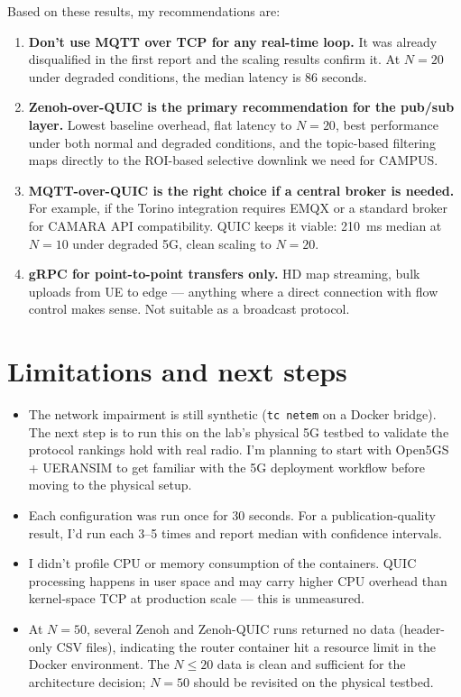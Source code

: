 \documentclass[11pt,a4paper]{article}
\begin{document}
Based on these results, my recommendations are:

\begin{enumerate}
    \item \textbf{Don't use MQTT over TCP for any real-time loop.} It was already disqualified in the first report and the scaling results confirm it. At $N=20$ under degraded conditions, the median latency is 86 seconds.

    \item \textbf{Zenoh-over-QUIC is the primary recommendation for the pub/sub layer.} Lowest baseline overhead, flat latency to $N=20$, best performance under both normal and degraded conditions, and the topic-based filtering maps directly to the ROI-based selective downlink we need for CAMPUS.

    \item \textbf{MQTT-over-QUIC is the right choice if a central broker is needed.} For example, if the Torino integration requires EMQX or a standard broker for CAMARA API compatibility. QUIC keeps it viable: 210~ms median at $N=10$ under degraded 5G, clean scaling to $N=20$.

    \item \textbf{gRPC for point-to-point transfers only.} HD map streaming, bulk uploads from UE to edge --- anything where a direct connection with flow control makes sense. Not suitable as a broadcast protocol.
\end{enumerate}

\section{Limitations and next steps}

\begin{itemize}
    \item The network impairment is still synthetic (\texttt{tc netem} on a Docker bridge). The next step is to run this on the lab's physical 5G testbed to validate the protocol rankings hold with real radio. I'm planning to start with Open5GS + UERANSIM to get familiar with the 5G deployment workflow before moving to the physical setup.

    \item Each configuration was run once for 30 seconds. For a publication-quality result, I'd run each 3--5 times and report median with confidence intervals.

    \item I didn't profile CPU or memory consumption of the containers. QUIC processing happens in user space and may carry higher CPU overhead than kernel-space TCP at production scale --- this is unmeasured.

    \item At $N=50$, several Zenoh and Zenoh-QUIC runs returned no data (header-only CSV files), indicating the router container hit a resource limit in the Docker environment. The $N \leq 20$ data is clean and sufficient for the architecture decision; $N=50$ should be revisited on the physical testbed.
\end{itemize}
\end{document}

